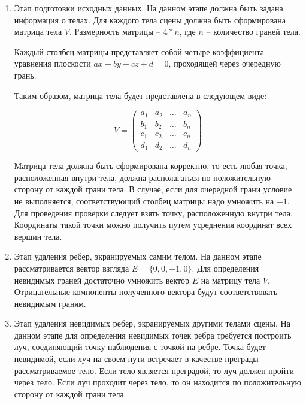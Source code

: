 \begin{enumerate}[label=\arabic*)]
	\item Этап подготовки исходных данных.
	На данном этапе должна быть задана информация о телах. Для каждого тела сцены должна быть сформирована матрица тела $V$. Размерность матрицы -- $4 * n$, где $n$ -- количество граней тела.
	
	Каждый столбец матрицы представляет собой четыре коэффициента уравнения плоскости $ax + by + cz + d = 0$, проходящей через очередную грань.
	
	Таким образом, матрица тела будет представлена в следующем виде:
	
	\begin{equation}
		V = \begin{pmatrix}
			a_{1} & a_{2} & \ldots & a_{n}\\
			b_{1} & b_{2} & \ldots & b_{n}\\
			c_{1} & c_{2} & \ldots & c_{n}\\
			d_{1} & d_{2} & \ldots & d_{n}
		\end{pmatrix}
	\end{equation}
	
	Матрица тела должна быть сформирована корректно, то есть любая точка, расположенная внутри тела, должна располагаться по положительную сторону от каждой грани тела. В случае, если для очередной грани условие не выполняется, соответствующий столбец матрицы надо умножить на $-1$. Для проведения проверки следует взять точку, расположенную внутри тела. Координаты такой точки можно получить путем усреднения координат всех вершин тела.
	\item Этап удаления ребер, экранируемых самим телом.
	На данном этапе рассматривается вектор взгляда $E = \{0, 0, -1, 0\}$.
	Для определения невидимых граней достаточно умножить вектор $E$ на матрицу тела $V$. Отрицательные компоненты полученного вектора будут соответствовать невидимым граням.

	\item Этап удаления невидимых ребер, экранируемых другими телами сцены.
	На данном этапе для определения невидимых точек ребра требуется построить луч, соединяющий точку наблюдения с точкой на ребре. Точка будет невидимой, если луч на своем пути встречает в качестве преграды рассматриваемое тело. Если тело является преградой, то луч должен пройти через тело. Если луч проходит через тело, то он находится по положительную сторону от каждой грани тела.
\end{enumerate}

